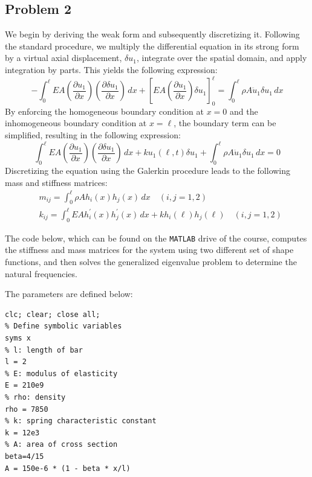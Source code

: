 \documentclass[12pt]{article}
\begin{document}
\subsection*{Problem 2}
We begin by deriving the weak form and subsequently discretizing it. Following the standard procedure, we multiply the differential equation in its strong form by a virtual axial displacement, \(\delta u_1\), integrate over the spatial domain, and apply integration by parts. This yields the following expression:
\begin{equation*}
    -\int_0^{\ell} E A\left(\frac{\partial u_1}{\partial x}\right)\left(\frac{\partial \delta u_1}{\partial x}\right)\, dx+\left[E A\left(\frac{\partial u_1}{\partial x}\right) \delta u_1\right]_0 ^{\ell}=\int_0^{\ell} \rho A \ddot{u}_1 \delta u_1\, dx
\end{equation*}
By enforcing the homogeneous boundary condition at \( x = 0 \) and the inhomogeneous boundary condition at \( x = \ell \), the boundary term can be simplified, resulting in the following expression:
\begin{equation*}
    \label{wfpb2}
    \int_0^{\ell} E A\left(\frac{\partial u_1}{\partial x}\right)\left(\frac{\partial \delta u_1}{\partial x}\right)\, dx+ku_{1}(\ell,t)\delta u_{1}+
    \int_0^{\ell} \rho A \ddot{u}_1 \delta u_1\, dx=0
\end{equation*}
Discretizing the equation using the Galerkin procedure leads to the following mass and stiffness matrices:
\begin{equation*}
    \begin{aligned}
         & m_{i j}=\int_0^{\ell} \rho A h_i(x) h_j(x) \, d x \quad (i, j=1,2)                                        \\
         & k_{i j}=\int_0^{\ell} E A h_{i}^\prime(x)h_{j}^\prime(x)\,  dx +k h_{i}(\ell)h_{j}(\ell) \quad (i, j=1,2)
    \end{aligned}
\end{equation*}

The code below, which can be found on the \texttt{MATLAB} drive of the course, computes the stiffness and mass matrices for the system using two different set of shape functions, and then solves the generalized eigenvalue problem to determine the natural frequencies.

The parameters are defined below:
\begin{verbatim}
clc; clear; close all;
% Define symbolic variables
syms x
% l: length of bar
l = 2                  
% E: modulus of elasticity
E = 210e9              
% rho: density
rho = 7850             
% k: spring characteristic constant 
k = 12e3                
% A: area of cross section
beta=4/15                
A = 150e-6 * (1 - beta * x/l) 
\end{verbatim}
\end{document}
